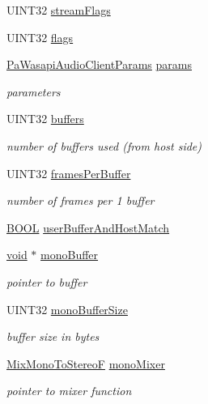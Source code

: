 \begin{DoxyCompactItemize}
U\+I\+N\+T32 \hyperlink{struct_pa_wasapi_sub_stream_aa321f145187ba40bc71f219db48c7edf}{stream\+Flags}
\item 
U\+I\+N\+T32 \hyperlink{struct_pa_wasapi_sub_stream_a0a614eb0d553c247fc55888c5a978b90}{flags}
\item 
\hyperlink{struct_pa_wasapi_audio_client_params}{Pa\+Wasapi\+Audio\+Client\+Params} \hyperlink{struct_pa_wasapi_sub_stream_ab9cb9497a30f6d0e1497b64896a9e4df}{params}
\begin{DoxyCompactList}\small\item\em parameters \end{DoxyCompactList}\item 
U\+I\+N\+T32 \hyperlink{struct_pa_wasapi_sub_stream_ac2fc3d1d317aa761577e2dc2ca782b97}{buffers}
\begin{DoxyCompactList}\small\item\em number of buffers used (from host side) \end{DoxyCompactList}\item 
U\+I\+N\+T32 \hyperlink{struct_pa_wasapi_sub_stream_a49cb0fd8c4261d2ac381cb27311de59b}{frames\+Per\+Buffer}
\begin{DoxyCompactList}\small\item\em number of frames per 1 buffer \end{DoxyCompactList}\item 
\hyperlink{nfilterkit_8h_a3be13892ae7076009afcf121347dd319}{B\+O\+OL} \hyperlink{struct_pa_wasapi_sub_stream_a7158c290cfa44a35117a04283b6f0fa2}{user\+Buffer\+And\+Host\+Match}
\item 
\hyperlink{sound_8c_ae35f5844602719cf66324f4de2a658b3}{void} $\ast$ \hyperlink{struct_pa_wasapi_sub_stream_a7933875c3daf995e66b0506e7ebb1331}{mono\+Buffer}
\begin{DoxyCompactList}\small\item\em pointer to buffer \end{DoxyCompactList}\item 
U\+I\+N\+T32 \hyperlink{struct_pa_wasapi_sub_stream_a77cc5c618182aa3fabb0821790b0d11e}{mono\+Buffer\+Size}
\begin{DoxyCompactList}\small\item\em buffer size in bytes \end{DoxyCompactList}\item 
\hyperlink{pa__win__wasapi_8c_ae15ae1737c49a3e379f0f418acff17e0}{Mix\+Mono\+To\+StereoF} \hyperlink{struct_pa_wasapi_sub_stream_a5e3eaa16893281c5b4f2ed1382fd214a}{mono\+Mixer}
\begin{DoxyCompactList}\small\item\em pointer to mixer function \end{DoxyCompactList}\item 

\end{DoxyCompactItemize}
